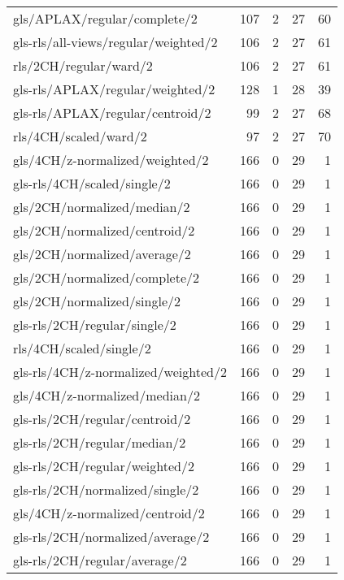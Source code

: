 \begin{longtable}{lrrrr}
    gls/APLAX/regular/complete/2              & 107 &  2 & 27 & 60 \\
    gls-rls/all-views/regular/weighted/2      & 106 &  2 & 27 & 61 \\
    rls/2CH/regular/ward/2                    & 106 &  2 & 27 & 61 \\
    gls-rls/APLAX/regular/weighted/2          & 128 &  1 & 28 & 39 \\
    gls-rls/APLAX/regular/centroid/2          &  99 &  2 & 27 & 68 \\
    rls/4CH/scaled/ward/2                     &  97 &  2 & 27 & 70 \\
    gls/4CH/z-normalized/weighted/2           & 166 &  0 & 29 &  1 \\
    gls-rls/4CH/scaled/single/2               & 166 &  0 & 29 &  1 \\
    gls/2CH/normalized/median/2               & 166 &  0 & 29 &  1 \\
    gls/2CH/normalized/centroid/2             & 166 &  0 & 29 &  1 \\
    gls/2CH/normalized/average/2              & 166 &  0 & 29 &  1 \\
    gls/2CH/normalized/complete/2             & 166 &  0 & 29 &  1 \\
    gls/2CH/normalized/single/2               & 166 &  0 & 29 &  1 \\
    gls-rls/2CH/regular/single/2              & 166 &  0 & 29 &  1 \\
    rls/4CH/scaled/single/2                   & 166 &  0 & 29 &  1 \\
    gls-rls/4CH/z-normalized/weighted/2       & 166 &  0 & 29 &  1 \\
    gls/4CH/z-normalized/median/2             & 166 &  0 & 29 &  1 \\
    gls-rls/2CH/regular/centroid/2            & 166 &  0 & 29 &  1 \\
    gls-rls/2CH/regular/median/2              & 166 &  0 & 29 &  1 \\
    gls-rls/2CH/regular/weighted/2            & 166 &  0 & 29 &  1 \\
    gls-rls/2CH/normalized/single/2           & 166 &  0 & 29 &  1 \\
    gls/4CH/z-normalized/centroid/2           & 166 &  0 & 29 &  1 \\
    gls-rls/2CH/normalized/average/2          & 166 &  0 & 29 &  1 \\
    gls-rls/2CH/regular/average/2             & 166 &  0 & 29 &  1 \\

\end{longtable}
